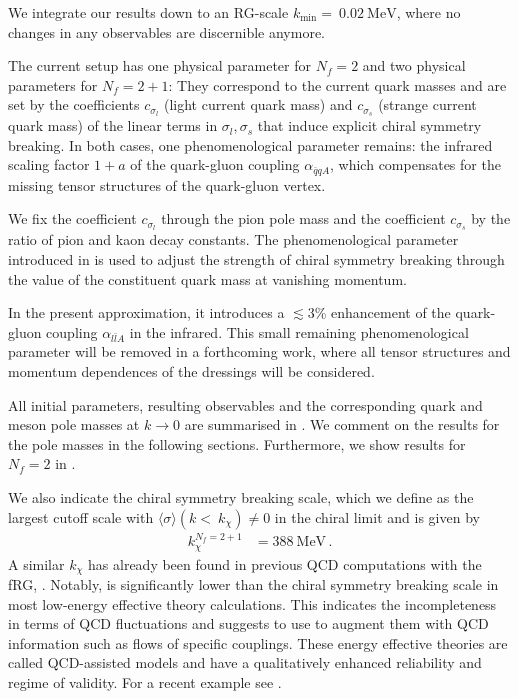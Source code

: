 \documentclass[aps,twocolumn,prd,superscriptaddress]{revtex4-2}
\begin{document}
We integrate our results down to an RG-scale $k_{\mathrm{min}}=~\qty{0.02}{\MeV}$, where no changes in any observables are discernible anymore. 

The current setup has one physical parameter for $N_f=2$ and two physical parameters for $N_f=2+1$: They correspond to the current quark masses and are set by the coefficients $c_{\sigma_l}$ (light current quark mass) and $c_{\sigma_s}$ (strange current quark mass) of the linear terms in $\sigma_l, \sigma_s$ that induce explicit chiral symmetry breaking. 
In both cases, one phenomenological parameter remains: the infrared scaling factor $1+a$ of the quark-gluon coupling $\alpha_{\bar q q A}$, which compensates for the missing tensor structures of the quark-gluon vertex. 

We fix the coefficient $c_{\sigma_l}$ through the pion pole mass and the coefficient $c_{\sigma_s} $ by the ratio of pion and kaon decay constants.
The phenomenological parameter introduced in  is used to adjust the strength of chiral symmetry breaking through the value of the constituent quark mass at vanishing momentum. 

In the present approximation, it introduces a $\lesssim 3$\% enhancement of the quark-gluon coupling $\alpha_{l\bar lA}$ in the infrared. This small remaining phenomenological parameter will be removed in a forthcoming work, where all tensor structures and momentum dependences of the dressings will be considered. 

All initial parameters, resulting observables and the corresponding quark and meson pole masses at $k\to 0$ are summarised in . We comment on the results for the pole masses in the following sections.
Furthermore, we show results for $N_f=2$ in .

We also indicate the chiral symmetry breaking scale, which we define as the largest cutoff scale with $\langle\sigma\rangle(k<~k_\chi)\neq 0$ in the chiral limit and is given by
%
\begin{align}
	k_\chi^{N_f=2+1} & = \qty{388}{\MeV}\,.
\label{eq:ChiralSymmbScale}
\end{align}
%
A similar $k_\chi$ has already been found in previous QCD computations with the fRG, \cite{Braun:2014ata, Mitter:2014wpa, Cyrol:2017ewj, Fu:2019hdw}. Notably,  is significantly lower than the chiral symmetry breaking scale in most low-energy effective theory calculations. This indicates the incompleteness in terms of QCD fluctuations and suggests to use to augment them with QCD information such as flows of specific couplings. These energy effective theories are called QCD-assisted models and have a qualitatively enhanced reliability and regime of validity. For a recent example see \cite{Fu:2023lcm}. 
\end{document}
